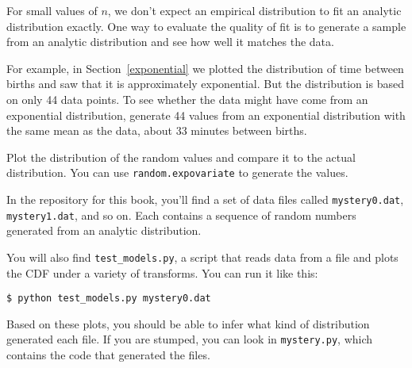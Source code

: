 \begin{exercise}
For small values of $n$, we don't expect an empirical distribution
to fit an analytic distribution exactly.  One way to evaluate
the quality of fit is to generate a sample from an analytic
distribution and see how well it matches the data.

For example, in Section~\ref{exponential} we plotted the distribution
of time between births and saw that it is approximately exponential.
But the distribution is based on only 44 data points.  To see whether
the data might have come from an exponential distribution, generate 44
values from an exponential distribution with the same mean as the
data, about 33 minutes between births.

Plot the distribution of the random values and compare it to the
actual distribution.  You can use {\tt random.expovariate} 
to generate the values.

\end{exercise}

\begin{exercise}
In the repository for this book, you'll find a set of data files
called {\tt mystery0.dat}, {\tt mystery1.dat}, and so on.  Each
contains a sequence of random numbers generated from an analytic
distribution.

You will also find \verb"test_models.py", a script that reads
data from a file and plots the CDF under a variety of transforms.
You can run it like this:

\begin{verbatim}
$ python test_models.py mystery0.dat
\end{verbatim}

Based on these plots, you should be able to infer what kind of
distribution generated each file.  If you are stumped, you can
look in {\tt mystery.py}, which contains the code that generated
the files.

\end{exercise}


